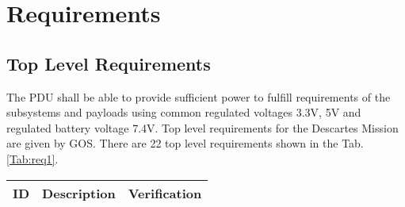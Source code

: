 \chapter{Requirements\label{cha:chapter3}}

\section{Top Level Requirements}
The PDU shall be able to provide sufficient power to fulfill requirements of the subsystems and payloads using common regulated voltages 3.3V, 5V and regulated battery voltage 7.4V. Top level requirements for the Descartes Mission are given by GOS. There are 22 top level requirements shown in the Tab. \ref{Tab:req1}. 

\begin{longtable}{p{1cm}p{11cm}p{2cm}} \toprule
	ID & Description & Verification \\ \midrule
	

	


\end{longtable}
